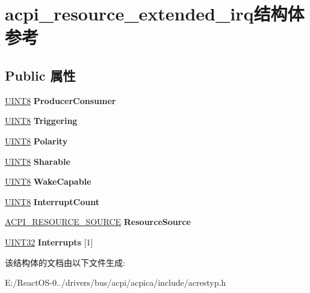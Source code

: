 \hypertarget{structacpi__resource__extended__irq}{}\section{acpi\+\_\+resource\+\_\+extended\+\_\+irq结构体 参考}
\label{structacpi__resource__extended__irq}
\subsection*{Public 属性}
\begin{DoxyCompactItemize}
\item 
\mbox{\label{structacpi__resource__extended__irq_ac1cec6a7f839bb962a3576823c4df845}} 
\hyperlink{_processor_bind_8h_ab27e9918b538ce9d8ca692479b375b6a}{U\+I\+N\+T8} {\bfseries Producer\+Consumer}
\item 
\mbox{\label{structacpi__resource__extended__irq_a4613bd6e4085b581a3a2b81c0b4e0f60}} 
\hyperlink{_processor_bind_8h_ab27e9918b538ce9d8ca692479b375b6a}{U\+I\+N\+T8} {\bfseries Triggering}
\item 
\mbox{\label{structacpi__resource__extended__irq_a822bfd88539615f4076cfeca425cf2a9}} 
\hyperlink{_processor_bind_8h_ab27e9918b538ce9d8ca692479b375b6a}{U\+I\+N\+T8} {\bfseries Polarity}
\item 
\mbox{\label{structacpi__resource__extended__irq_a9c5318c5c6429fca8cbb0991f5b5129e}} 
\hyperlink{_processor_bind_8h_ab27e9918b538ce9d8ca692479b375b6a}{U\+I\+N\+T8} {\bfseries Sharable}
\item 
\mbox{\label{structacpi__resource__extended__irq_a0faddfc8d317089aa5a3a77104c14f78}} 
\hyperlink{_processor_bind_8h_ab27e9918b538ce9d8ca692479b375b6a}{U\+I\+N\+T8} {\bfseries Wake\+Capable}
\item 
\mbox{\label{structacpi__resource__extended__irq_a85e9f6d2b56626b985911f54d18d1761}} 
\hyperlink{_processor_bind_8h_ab27e9918b538ce9d8ca692479b375b6a}{U\+I\+N\+T8} {\bfseries Interrupt\+Count}
\item 
\mbox{\label{structacpi__resource__extended__irq_ab76f0becdebbead5376cd1e188eb0f4b}} 
\hyperlink{structacpi__resource__source}{A\+C\+P\+I\+\_\+\+R\+E\+S\+O\+U\+R\+C\+E\+\_\+\+S\+O\+U\+R\+CE} {\bfseries Resource\+Source}
\item 
\mbox{\label{structacpi__resource__extended__irq_acba832d9a2c39c18cf852a7ce05f1491}} 
\hyperlink{_processor_bind_8h_ae1e6edbbc26d6fbc71a90190d0266018}{U\+I\+N\+T32} {\bfseries Interrupts} \mbox{[}1\mbox{]}
\end{DoxyCompactItemize}


该结构体的文档由以下文件生成\+:\begin{DoxyCompactItemize}
\item 
E\+:/\+React\+O\+S-\/0../drivers/bus/acpi/acpica/include/acrestyp.\+h\end{DoxyCompactItemize}
